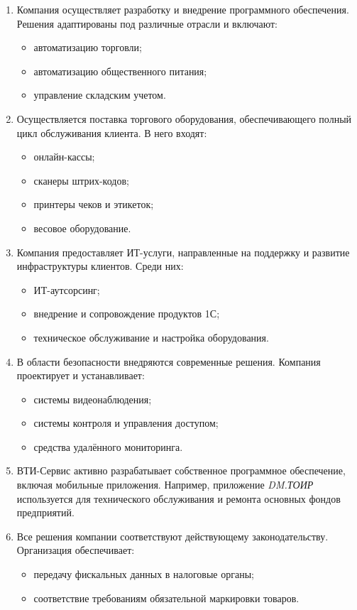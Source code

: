 \begin{enumerate}
  \item Компания осуществляет разработку и внедрение программного обеспечения. Решения адаптированы под различные отрасли и включают:
  \begin{itemize}
    \item автоматизацию торговли;
    \item автоматизацию общественного питания;
    \item управление складским учетом.
  \end{itemize}

  \item Осуществляется поставка торгового оборудования, обеспечивающего полный цикл обслуживания клиента. В него входят:
  \begin{itemize}
    \item онлайн-кассы;
    \item сканеры штрих-кодов;
    \item принтеры чеков и этикеток;
    \item весовое оборудование.
  \end{itemize}

  \item Компания предоставляет ИТ-услуги, направленные на поддержку и развитие инфраструктуры клиентов. Среди них:
  \begin{itemize}
    \item ИТ-аутсорсинг;
    \item внедрение и сопровождение продуктов 1С;
    \item техническое обслуживание и настройка оборудования.
  \end{itemize}

  \item В области безопасности внедряются современные решения. Компания проектирует и устанавливает:
  \begin{itemize}
    \item системы видеонаблюдения;
    \item системы контроля и управления доступом;
    \item средства удалённого мониторинга.
  \end{itemize}

  \item ВТИ-Сервис активно разрабатывает собственное программное обеспечение, включая мобильные приложения. Например, приложение \textit{DM.ТОИР} используется для технического обслуживания и ремонта основных фондов предприятий.

  \item Все решения компании соответствуют действующему законодательству. Организация обеспечивает:
  \begin{itemize}
    \item передачу фискальных данных в налоговые органы;
    \item соответствие требованиям обязательной маркировки товаров.
  \end{itemize}
\end{enumerate}

